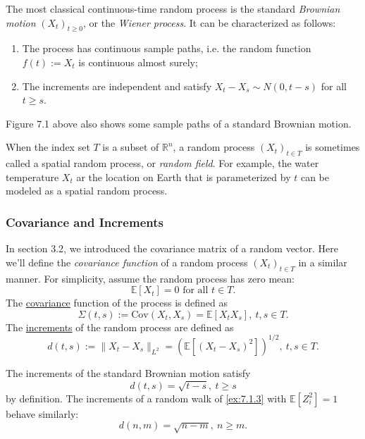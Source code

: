 \begin{example}
\label{ex:7.1.4}
The most classical continuous-time random process is the standard \textit{Brownian motion} $(X_t)_{t \geq 0}$, 
or the \textit{Wiener process}. It can be characterized as follows:
\begin{enumerate}[label={(\roman*)}]
	\item The process has continuous sample paths, i.e. the random function $f(t) := X_t$ is continuous almost 
	surely; 
	\item The increments are independent and satisfy $X_t - X_s \sim N(0, t - s)$ for all $t \geq s$.
\end{enumerate}
Figure 7.1 above also shows some sample paths of a standard Brownian motion.
\end{example}

\begin{example}
\label{ex:7.1.5}
When the index set $T$ is a subset of $\mathbb{R}^n$, a random process $(X_t)_{t \in T}$ is sometimes called a 
spatial random process, or \textit{random field}. For example, the water temperature $X_t$ ar the location on 
Earth that is parameterized by $t$ can be modeled as a spatial random process.
\end{example}


\subsubsection{Covariance and Increments}
In section 3.2, we introduced the covariance matrix of a random vector. Here we'll define the 
\textit{covariance function} of a random process $(X_t)_{t \in T}$ in a similar manner. For simplicity, 
assume the random process has zero mean: 
\[ \mathbb{E}\left[ X_t \right] = 0 \text{ for all } t \in T. \]
The \underline{covariance} function of the process is defined as
\[ \Sigma(t, s) := \mathrm{Cov}(X_t, X_s) = \mathbb{E}\left[ X_tX_s \right], \ t, s \in T. \]
The \underline{increments} of the random process are defined as 
\[ d(t, s) := \lVert X_t - X_s \rVert_{L^2} = (\mathbb{E}\left[ (X_t - X_s)^2 \right])^{1/2}, \ t, s \in T. \]

\begin{example}[]
\label{ex:7.1.6}
The increments of the standard Brownian motion satisfy 
\[ d(t, s) = \sqrt{t - s}, \ t \geq s \]
by definition. The increments of a random walk of \cref{ex:7.1.3} with $\mathbb{E}\left[ Z_i^2 \right] = 1$ 
behave similarly: 
\[ d(n, m) = \sqrt{n - m}, \ n \geq m. \]
\end{example}

